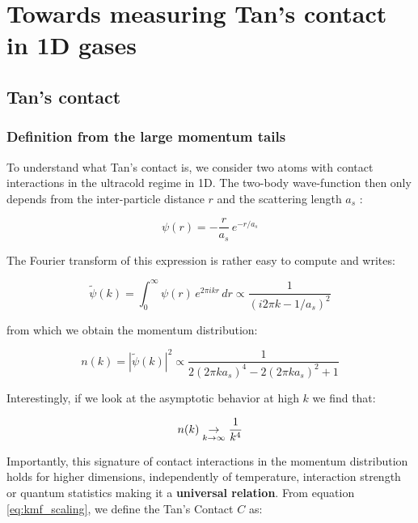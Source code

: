 \chapterimage{}

\chapter{Towards measuring Tan's contact in 1D gases}

\section{Tan's contact}

\subsection{Definition from the large momentum tails}

To understand what Tan's contact is, we consider two atoms with contact interactions in the ultracold regime in 1D. The two-body wave-function then only depends from the inter-particle distance $r$ and the scattering length $a_s$ \cite{viverit2004momentum}:

\begin{equation}
    \psi(r) = - \frac{r}{a_s} \, e^{-r/a_s}
\end{equation}

\noindent The Fourier transform of this expression is rather easy to compute and writes:

\begin{equation}
    \tilde{\psi}(k) = \int_0^\infty \psi(r) \, e^{2 \pi i k r} \, dr \propto \frac{1}{(i 2 \pi k - 1/a_s)^2}
\end{equation}

\noindent from which we obtain the momentum distribution:

\begin{equation}
     n(k) = |\tilde{\psi}(k) |^2 \propto \frac{1}{2(2 \pi k a_s)^4 - 2(2 \pi k a_s)^2 +1}
\end{equation}

\noindent Interestingly, if we look at the asymptotic behavior at high $k$ we find that:

\begin{equation}
    n(k) \underrel{k \to \infty} \to \frac{1}{k^4}
    \label{eq:kmf_scaling}
\end{equation}

\noindent Importantly, this signature of contact interactions in the momentum distribution holds for higher dimensions, independently of temperature, interaction strength or quantum statistics making it a \textbf{universal relation}. From equation \ref{eq:kmf_scaling}, we define the Tan's Contact $C$ as:

